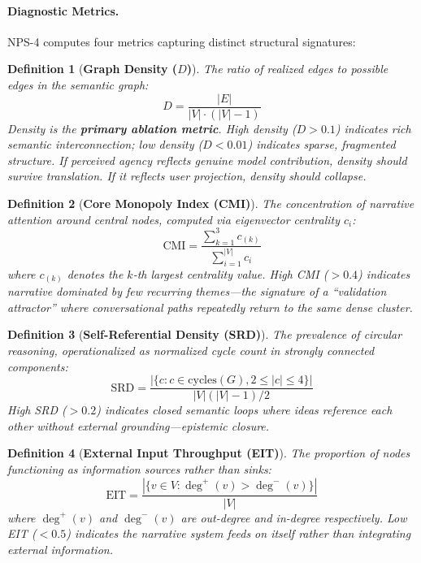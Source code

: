 \documentclass[11pt, a4paper, oneside]{article}
\theoremstyle{analytic}
\newtheorem{definition}{Definition}
\begin{document}
\paragraph{Diagnostic Metrics.}
NPS-4 computes four metrics capturing distinct structural signatures:

\begin{definition}[\textbf{Graph Density ($D$)}]
The ratio of realized edges to possible edges in the semantic graph:
\begin{equation}
    D = \frac{|E|}{|V| \cdot (|V| - 1)}
\end{equation}
Density is the \textbf{primary ablation metric}. High density ($D > 0.1$) indicates rich semantic interconnection; low density ($D < 0.01$) indicates sparse, fragmented structure. If perceived agency reflects genuine model contribution, density should survive translation. If it reflects user projection, density should collapse.
\end{definition}

\begin{definition}[\textbf{Core Monopoly Index (CMI)}]
The concentration of narrative attention around central nodes, computed via eigenvector centrality $c_i$:
\begin{equation}
    \text{CMI} = \frac{\sum_{k=1}^{3} c_{(k)}}{\sum_{i=1}^{|V|} c_i}
\end{equation}
where $c_{(k)}$ denotes the $k$-th largest centrality value. High CMI ($> 0.4$) indicates narrative dominated by few recurring themes---the signature of a ``validation attractor'' where conversational paths repeatedly return to the same dense cluster.
\end{definition}

\begin{definition}[\textbf{Self-Referential Density (SRD)}]
The prevalence of circular reasoning, operationalized as normalized cycle count in strongly connected components:
\begin{equation}
    \text{SRD} = \frac{|\{c : c \in \text{cycles}(G), 2 \leq |c| \leq 4\}|}{|V|(|V|-1)/2}
\end{equation}
High SRD ($> 0.2$) indicates closed semantic loops where ideas reference each other without external grounding---epistemic closure.
\end{definition}

\begin{definition}[\textbf{External Input Throughput (EIT)}]
The proportion of nodes functioning as information sources rather than sinks:
\begin{equation}
    \text{EIT} = \frac{|\{v \in V : \deg^+(v) > \deg^-(v)\}|}{|V|}
\end{equation}
where $\deg^+(v)$ and $\deg^-(v)$ are out-degree and in-degree respectively. Low EIT ($< 0.5$) indicates the narrative system feeds on itself rather than integrating external information.
\end{definition}
\end{document}
